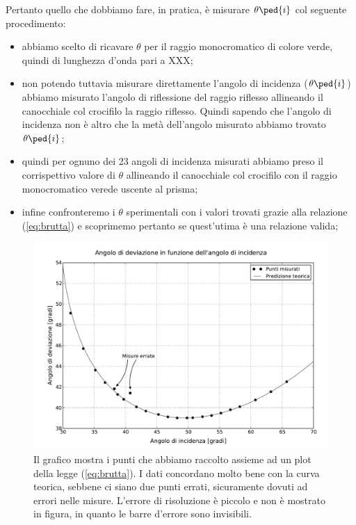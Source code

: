 Pertanto quello che dobbiamo fare, in pratica, è misurare $\theta\ped{i}$ col seguente procedimento:

\begin{itemize}
	\item{abbiamo scelto di ricavare $\theta$ per il raggio monocromatico di colore verde, quindi di lunghezza d'onda pari a XXX;}
	\item{non potendo tuttavia misurare direttamente l'angolo di incidenza ($\theta\ped{i}$) abbiamo misurato l'angolo di riflessione del raggio riflesso allineando il canocchiale col crocifilo la raggio riflesso. Quindi sapendo che l'angolo di incidenza non è altro che la metà dell'angolo misurato abbiamo trovato $\theta\ped{i}$;}
	\item{quindi per ognuno dei 23 angoli di incidenza misurati abbiamo preso il corrispettivo valore di $\theta$ allineando il canocchiale col crocifilo con il raggio monocromatico verede uscente al prisma;}
	\item{infine confronteremo i $\theta$ sperimentali con i valori trovati grazie alla relazione (\ref{eq:brutta}) e scoprimemo pertanto se quest'utima è una relazione valida;}
\end{itemize}

\begin{figure}[b]
    \includegraphics[width=16cm]{graph.pdf}
    \caption{Il grafico mostra i punti che abbiamo raccolto assieme ad un plot della legge (\ref{eq:brutta}). I dati concordano
    molto bene con la curva teorica, sebbene ci siano due punti errati, sicuramente dovuti ad errori nelle misure. L'errore di
    risoluzione è piccolo e non è mostrato in figura, in quanto le barre d'errore sono invisibili.}
    \label{fig:dev}
\end{figure}


